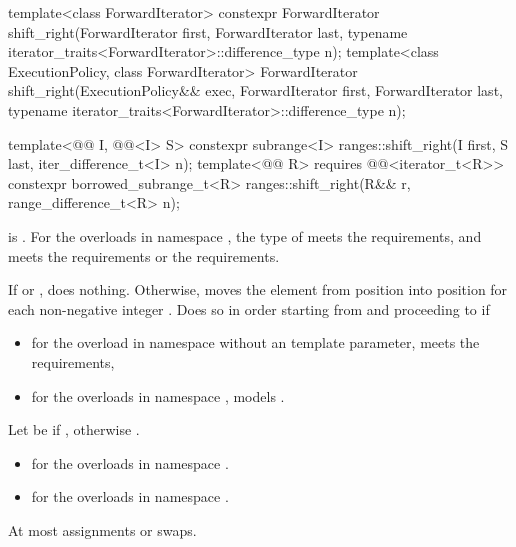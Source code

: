 %
\begin{itemdecl}
template<class ForwardIterator>
  constexpr ForwardIterator
    shift_right(ForwardIterator first, ForwardIterator last,
                typename iterator_traits<ForwardIterator>::difference_type n);
template<class ExecutionPolicy, class ForwardIterator>
  ForwardIterator
    shift_right(ExecutionPolicy&& exec, ForwardIterator first, ForwardIterator last,
                typename iterator_traits<ForwardIterator>::difference_type n);

template<@@ I, @@<I> S>
  constexpr subrange<I> ranges::shift_right(I first, S last, iter_difference_t<I> n);
template<@@ R>
  requires @@<iterator_t<R>>
  constexpr borrowed_subrange_t<R> ranges::shift_right(R&& r, range_difference_t<R> n);
\end{itemdecl}

\begin{itemdescr}
\pnum
\expects
{} is .
For the overloads in namespace ,
the type of  meets the  requirements,
and  meets
the  requirements or
the  requirements.

\pnum
\effects
If  or , does nothing.
Otherwise, moves the element
from position  into position 
for each non-negative integer .
Does so in order starting
from  and proceeding to  if
\begin{itemize}
\item
for the overload in namespace 
without an  template parameter,
 meets the  requirements,
\item
for the overloads in namespace ,
 models .
\end{itemize}

\pnum
\returns
Let  be  if ,
otherwise .
\begin{itemize}
\item
{} for the overloads in namespace .
\item
{}
for the overloads in namespace .
\end{itemize}

\pnum
\complexity
At most  assignments or swaps.
\end{itemdescr}

